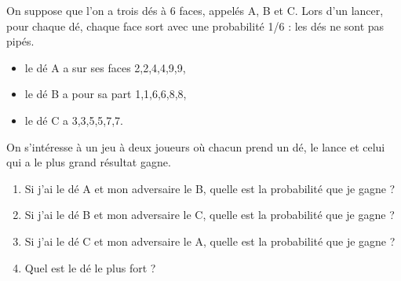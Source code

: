 \documentclass[10pt, a4paper]{article}
\begin{document}



\vspace{3cm}



\begin{tcolorbox}[lefttitle=1cm, colframe=gray!75!black, colback=white, title=\textbf{Exercice 6 : Les dés non transitifs}]
On suppose que l’on a trois dés à 6 faces, appelés A, B et C. Lors d’un lancer, pour chaque dé, chaque
face sort avec une probabilité 1/6 : les dés ne sont pas pipés.
\begin{itemize}
    \item le dé A a sur ses faces 2,2,4,4,9,9,
    \item le dé B a pour sa part 1,1,6,6,8,8,
    \item le dé C a 3,3,5,5,7,7.
\end{itemize}


\begin{tcolorbox}[lefttitle=1cm, colframe=gray!75!black, colback=white, title=\textbf{EXERCICE}]

On s’intéresse à un jeu à deux joueurs où chacun prend un dé, le lance et celui qui a le plus grand résultat gagne.

\begin{enumerate}
    \item Si j’ai le dé A et mon adversaire le B, quelle est la probabilité que je gagne ?
    \item Si j’ai le dé B et mon adversaire le C, quelle est la probabilité que je gagne ?
    \item Si j’ai le dé C et mon adversaire le A, quelle est la probabilité que je gagne ?
    \item Quel est le dé le plus fort ?
\end{enumerate}

\vspace{6cm}

\end{tcolorbox}

\end{tcolorbox}
\end{document}
